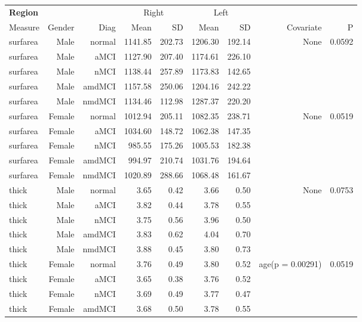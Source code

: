 \documentclass[12pt]{article}\usepackage[]{graphicx}\usepackage[]{color}
\newcommand\T{\rule{0pt}{2.6ex}}
\newcommand\B{\rule[-1.2ex]{0pt}{0pt}}
\begin{document}
  \newpage
\begin{sidewaystable}
  \centering
  \footnotesize
  \begin{tabular}{l|rr|rr|rr|rr}
  \hline
	\textbf{Region} & & & \multicolumn{2}{c}{Right} \T & \multicolumn{2}{|c}{Left} & & \\
	\multicolumn{1}{l|}{Measure} \T\B & Gender & Diag & Mean & SD & Mean & SD & Covariate & P \\
	\hline\hline
 surfarea & Male & normal & 1141.85 & 202.73 & 1206.30 & 192.14 & None & 0.0592 \\ 
  surfarea & Male & aMCI & 1127.90 & 207.40 & 1174.61 & 226.10 &  &  \\ 
  surfarea & Male & nMCI & 1138.44 & 257.89 & 1173.83 & 142.65 &  &  \\ 
  surfarea & Male & amdMCI & 1157.58 & 250.06 & 1204.16 & 242.22 &  &  \\ 
  surfarea & Male & nmdMCI & 1134.46 & 112.98 & 1287.37 & 220.20 &  &  \\ 
   \hline
surfarea & Female & normal & 1012.94 & 205.11 & 1082.35 & 238.71 & None & 0.0519 \\ 
  surfarea & Female & aMCI & 1034.60 & 148.72 & 1062.38 & 147.35 &  &  \\ 
  surfarea & Female & nMCI & 985.55 & 175.26 & 1005.53 & 182.38 &  &  \\ 
  surfarea & Female & amdMCI & 994.97 & 210.74 & 1031.76 & 194.64 &  &  \\ 
  surfarea & Female & nmdMCI & 1020.89 & 288.66 & 1068.48 & 161.67 &  &  \\ 
   \hline
thick & Male & normal & 3.65 & 0.42 & 3.66 & 0.50 & None & 0.0753 \\ 
  thick & Male & aMCI & 3.82 & 0.44 & 3.78 & 0.55 &  &  \\ 
  thick & Male & nMCI & 3.75 & 0.56 & 3.96 & 0.50 &  &  \\ 
  thick & Male & amdMCI & 3.83 & 0.62 & 4.04 & 0.70 &  &  \\ 
  thick & Male & nmdMCI & 3.88 & 0.45 & 3.80 & 0.73 &  &  \\ 
   \hline
thick & Female & normal & 3.76 & 0.49 & 3.80 & 0.52 & age(p = 0.00291) & 0.0519 \\ 
  thick & Female & aMCI & 3.65 & 0.38 & 3.76 & 0.52 &  &  \\ 
  thick & Female & nMCI & 3.69 & 0.49 & 3.77 & 0.47 &  &  \\ 
  thick & Female & amdMCI & 3.68 & 0.50 & 3.78 & 0.55 &  &  \\ 

\end{tabular}
\end{sidewaystable}
\end{document}
